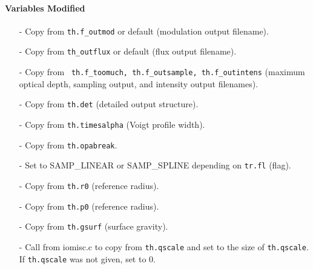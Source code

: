\documentclass[letterpaper,12pt]{article}
\begin{document}
\paragraph{Variables Modified}
\begin{enumerate}[leftmargin=10pt, noitemsep, parsep=0pt, topsep=0ex]
\item[-] Copy  from {\tt th.f\_outmod} or default (modulation
  output filename).
\item[-] Copy  from {\tt th\_outflux} or default (flux output filename).
\item[-] Copy  from {\tt
    th.f\_toomuch, th.f\_outsample, th.f\_outintens} (maximum optical depth,
  sampling output, and intensity output filenames).
\item[-] Copy  from {\tt th.det} (detailed output structure).
\item[-] Copy  from {\tt th.timesalpha} (Voigt profile width).
\item[-] Copy  from {\tt th.opabreak}.
\item[-] Set  to SAMP\_LINEAR or SAMP\_SPLINE depending on {\tt tr.fl} (flag).
\item[-] Copy  from {\tt th.r0} (reference radius).
\item[-] Copy  from {\tt th.p0} (reference radius).
\item[-] Copy  from {\tt th.gsurf} (surface gravity).
\item[-] Call  from iomisc.c to copy   from {\tt th.qscale} and set  to the size of {\tt th.qscale}. If {\tt th.qscale} was not given, set  to 0.
\end{enumerate}
\end{document}
